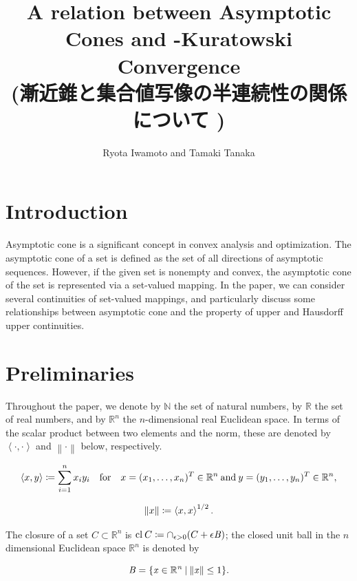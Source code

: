 \documentclass[a4paper,11pt]{jsarticle}
\title{%
A relation between Asymptotic Cones and \Painleve-Kuratowski Convergence \\
  \large (漸近錐と集合値写像の半連続性の関係について
  )}
\author{Ryota Iwamoto and Tamaki Tanaka}
\affil{Graduate School of Science and Technology
Niigata University}
\date{\vspace{-5ex}}
\theoremstyle{definition}
\newcommand{\NaturalNumberSet}{\mathbb{N}}
\newcommand{\RealNumberSet}{\mathbb{R}}
\newcommand{\NDemenstionalRealEuclideanSpace}{\mathbb{R}^n}
\newcommand{\InnerProduct}[2]{\left\langle {#1},{#2}\right\rangle} %
\newcommand{\Norm}[1]{\left\lVert {#1} \right\rVert} %
\newcommand{\Closure}[1]{\text{\rm cl\:${#1}$}} %
\newcommand{\SetForm}[2]{
  \{{#1}\:|\:{#2}\}
}
\begin{document}
\maketitle
\section{\rm Introduction}

Asymptotic cone is a significant concept in convex analysis and optimization. The asymptotic cone of a set is defined as the set of all directions of asymptotic sequences. However, if the given set is nonempty and convex, the asymptotic cone of the set is represented via a set-valued mapping. In the paper, we can consider several continuities of set-valued mappings, and particularly discuss some relationships between asymptotic cone and the property of upper and Hausdorff upper continuities.

\section{\rm Preliminaries}

Throughout the paper, we denote by $\NaturalNumberSet$ the set of natural numbers, by $\RealNumberSet$ the set of real numbers, and by $\NDemenstionalRealEuclideanSpace$ the $n$-dimensional real Euclidean space. In terms of the scalar product between two elements and the norm, these are denoted by $\InnerProduct{\cdot}{\cdot}$ and $\Norm{\cdot}$ below, respectively.

\begin{equation}
  \left\langle x,y\right\rangle \coloneqq \sum_{i = 1}^{n} x_i y_i \quad \text{for} \quad x=(x_1,\dots,x_n)^T \in \mathbb{R}^n \:\text{and}\: y=(y_1,\dots,y_n)^T \in  \mathbb{R}^n, \notag
\end{equation}

\begin{equation}
  \left\lVert x \right\rVert \coloneqq \InnerProduct{x}{x} ^{1/2}. \notag
\end{equation}

The closure of a set $C \subset \NDemenstionalRealEuclideanSpace$ is $\Closure{C} \coloneqq \cap_{\epsilon > 0}(C+\epsilon \it{B})$; the closed unit ball in the $n$ dimensional Euclidean space $\NDemenstionalRealEuclideanSpace$ is denoted by

\begin{equation}
  \it{B} = \SetForm{x \in \NDemenstionalRealEuclideanSpace}{\left\lVert x \right\rVert \leq \text{1}}. \notag
\end{equation}
\end{document}
